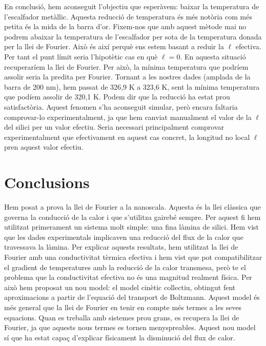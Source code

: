 \documentclass{article}
\begin{document}
En conclusi\'{o}, hem aconseguit l'objectiu que esper\`{a}vem: baixar la temperatura de l'escalfador met\`{a}l\textperiodcentered lic. Aquesta reducci\'{o} de temperatura \'{e}s m\'{e}s not\`{o}ria com m\'{e}s petita \'{e}s la mida de la barra d'or. Fixem-nos que amb aquest m\`{e}tode mai no podrem abaixar la temperatura de l'escalfador per sota de la temperatura donada per la llei de Fourier. Aix\`{o} \'{e}s aix\'{i} perqu\`{e} ens estem basant a reduir la $\ell$ efectiva. Per tant el punt l\'{i}mit seria l'hipot\`{e}tic cas en qu\`{e} $\ell=0$. En aquesta situaci\'{o} recuperar\'{i}em la llei de Fourier. Per aix\`{o}, la m\'{i}nima temperatura que podr\'{i}em assolir seria la predita per Fourier. Tornant a les nostres dades (amplada de la barra de 200 nm), hem passat de 326,9 K a 323,6 K, sent la m\'{i}nima temperatura que pod\'{i}em assolir de 320,1 K. Podem dir que la reducci\'{o} ha estat prou satisfact\`{o}ria. Aquest fenomen s'ha aconseguit simular, per\`{o} encara faltaria comprovar-lo experimentalment, ja que hem canviat manualment el valor de la $\ell$ del silici per un valor efectiu. Seria necessari principalment comprovar experimentalment que efectivament en aquest cas concret, la longitud no local $\ell$ pren aquest valor efectiu.

\section{Conclusions}

Hem posat a prova la llei de Fourier a la nanoscala. Aquesta \'{e}s la llei cl\`{a}ssica que governa la conducci\'{o} de la calor i que s'utilitza gaireb\'{e} sempre. Per aquest fi hem utilitzat primerament un sistema molt simple: una fina l\`{a}mina de silici. Hem vist que les dades experimentals implicaven una reducci\'{o} del flux de la calor que travessava la l\`{a}mina. Per explicar aquests resultats, hem utilitzat la llei de Fourier amb una conductivitat t\`{e}rmica efectiva i hem vist que pot compatibilitzar el gradient de temperatures amb la reducci\'{o} de la calor transmesa, per\`{o} te el problema que la conductivitat efectiva no \'{e}s una magnitud realment f\'{i}sica. Per aix\`{o} hem proposat un nou model: el model cin\`{e}tic col\textperiodcentered lectiu, obtingut fent aproximacions a partir de l'equaci\'{o} del transport de Boltzmann. Aquest model \'{e}s m\'{e}s general que la llei de Fourier en tenir en compte m\'{e}s termes a les seves equacions. Quan es treballa amb sistemes prou grans, es recupera la llei de Fourier, ja que aquests nous termes es tornen menyspreables. Aquest nou model s\'{i} que ha estat capa\c{c} d'explicar f\'{i}sicament la disminuci\'{o} del flux de calor.
\end{document}
